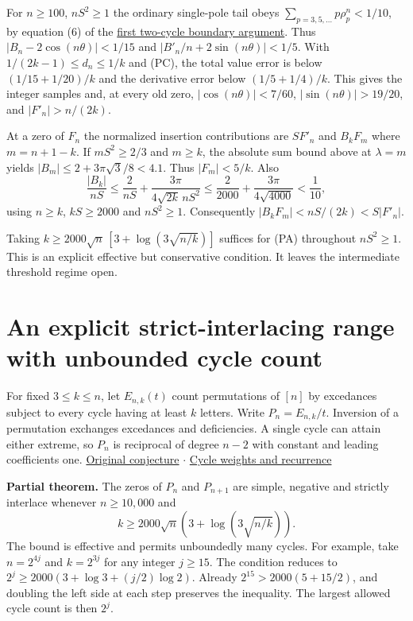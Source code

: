 For $n\ge100$, $nS^2\ge1$ the ordinary single-pole tail obeys $\sum_{p=3,5,\ldots}p\rho_p^n<1/10$, by equation (6) of the \href{https://github.com/ProgramComputer/open-math-research/blob/main/topics/long-cycle-excedances/first-lag.md}{first two-cycle boundary argument}. Thus $|B_n-2\cos(n\theta)|<1/15$ and $|B'_n/n+2\sin(n\theta)|<1/5$. With $1/(2k-1)\le d_n\le1/k$ and (PC), the total value error is below $(1/15+1/20)/k$ and the derivative error below $(1/5+1/4)/k$. This gives the integer samples and, at every old zero, $|\cos(n\theta)|<7/60$, $|\sin(n\theta)|>19/20$, and $|F'_n|>n/(2k)$.

At a zero of $F_n$ the normalized insertion contributions are $S F'_n$ and $B_k F_m$ where $m=n+1-k$. If $mS^2\ge2/3$ and $m\ge k$, the absolute sum bound above at $\lambda=m$ yields $|B_m|\le2+3\pi\sqrt3/8< 4.1$. Thus $|F_m|<5/k$. Also
\[
\frac{|B_k|}{nS}\le \frac2{nS}+\frac{3\pi}{4\sqrt{2k}\,nS^2}
\le \frac{2}{2000}+\frac{3\pi}{4\sqrt{4000}}<\frac1{10},
\]
using $n\ge k$, $kS\ge2000$ and $nS^2\ge1$. Consequently $|B_kF_m|<nS/(2k)<S|F'_n|$.

Taking $k\ge2000\sqrt n\,[3+\log(3\sqrt{n/k})]$ suffices for (PA) throughout $nS^2\ge1$. This is an explicit effective but conservative condition. It leaves the intermediate threshold regime open.

\section{An explicit strict-interlacing range with unbounded cycle count}

For fixed $3\le k\le n$, let $E_{n,k}(t)$ count permutations of $[n]$ by excedances subject to every cycle having at least $k$ letters. Write $P_n=E_{n,k}/t$. Inversion of a permutation exchanges excedances and deficiencies. A single cycle can attain either extreme, so $P_n$ is reciprocal of degree $n-2$ with constant and leading coefficients one. \href{https://www.symmetricfunctions.com/realRootedOpenProblems.htm\#conjLongCycleExcedances}{Original conjecture} $\cdot$ \href{https://github.com/ProgramComputer/open-math-research/blob/main/topics/long-cycle-excedances/two-cycle-band.md}{Cycle weights and recurrence}

\textbf{Partial theorem.} The zeros of $P_n$ and $P_{n+1}$ are simple, negative and strictly interlace whenever $n\ge10{,}000$ and
\[
k\ge2000\sqrt n\left(3+\log\left(3\sqrt{n/k}\right)\right).
\]
The bound is effective and permits unboundedly many cycles. For example, take $n=2^{4j}$ and $k=2^{3j}$ for any integer $j\ge15$. The condition reduces to $2^j\ge2000(3+\log3+(j/2)\log2)$. Already $2^{15}>2000(5+15/2)$, and doubling the left side at each step preserves the inequality. The largest allowed cycle count is then $2^j$.

